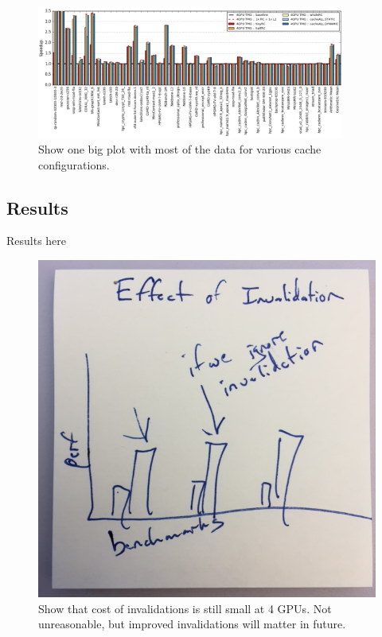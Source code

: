 \begin{figure}[tp]
    \centering
    \includegraphics[width=0.9\textwidth]{figures/caching.jpg}
    \caption{Show one big plot with most of the data for various cache configurations.}
    \label{fig:caching}
\end{figure}


\subsection{Results}
Results here

\begin{figure}[tp]
    \centering
    \includegraphics[width=0.9\columnwidth]{figures/invalidations.jpg}
    \caption{Show that cost of invalidations is still small at 4 GPUs.  Not unreasonable, but improved invalidations will matter in future.}
    \label{fig:invalidations}
\end{figure}


